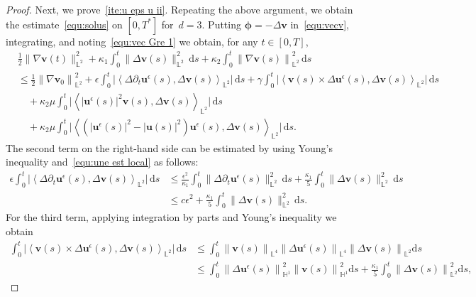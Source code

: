\documentclass[11pt,reqno]{amsart}
\theoremstyle{definition}
\numberwithin{equation}{section}
\newcommand{\bff}{\boldsymbol}
\newcommand{\bb}{\mathbb}
\newcommand{\ds}{\mathrm{d}s}
\newcommand{\nn}{\nonumber}
\newcommand{\norm}[2]{\left\|{#1}\right\|_{#2}}
\newcommand{\inpro}[2]{\left\langle#1,#2\right\rangle}
\begin{document}
\begin{proof}
	Next, we prove~\ref{ite:u eps u ii}. Repeating the above argument, we obtain the estimate~\eqref{equ:solus} on $[0,T^\ast]$ for~$d=3$.
	Putting $\bff{\phi}=-\Delta \bff{\bff{v}}$ in~\eqref{equ:vecv},
	integrating, and noting~\eqref{equ:vec Gre 1} we obtain, for any $t\in [0,T]$,
	\begin{align}\label{equ:vec Delta v}
		&\frac12 \|\nabla \bff{v}(t)\|_{\bb{L}^2}^2
		+\kappa_1\int_0^t \|\Delta\bff{v}(s)\|^2_{\bb{L}^2}\,\ds
		+
		\kappa_2\int_0^t \norm{\nabla \bff{v}(s)}{\bb{L}^2}^2\,\ds
		\nn\\
		&\le
		\frac12 \norm{\nabla \bff{v}_0}{\bb{L}^2}^2
		+
		\epsilon\int_0^t 
		\Big|
		\inpro{\Delta \partial_t \bff{u}^\epsilon(s)}{\Delta \bff{v}(s)}_{\bb{L}^2} \Big|\,\ds
		+
		\gamma\int_0^t 
		\Big|
		\inpro{\bff{v}(s)\times\Delta\bff{u}^\epsilon(s)}{\Delta\bff{v}(s)}_{\bb{L}^2}\Big|\,\ds
		\nn \\
		&\quad
		+\kappa_2\mu
		\int_{0}^{t} 
		\Big|
		\inpro{|\bff{u}^\epsilon(s)|^2\bff{v}(s)}{\Delta \bff{v}(s)}_{\bb{L}^2}\Big| \,\ds
		\nn \\
		&\quad
		+\kappa_2\mu
		\int_0^t 
		\Big|
		\inpro{(|\bff{u}^\epsilon(s)|^2-|\bff{u}(s)|^2)\bff{u}^\epsilon(s)}{\Delta \bff{v}(s)}_{\bb{L}^2}\Big| \,\ds.
	\end{align}
	The second term on the right-hand side can be estimated by using Young's
	inequality and~\eqref{equ:une est local} as follows:
	\begin{align*}%
		\epsilon \int_0^t 
		\Big|
		\inpro{\Delta\partial_t \bff{u}^\epsilon(s)}{\Delta \bff{v}(s)}_{\bb{L}^2} \Big| \,\ds
		&\leq 
		\frac{\epsilon^2}{\kappa_1}\int_0^t \|\Delta\partial_t \bff{u}^\epsilon(s)\|_{\bb{L}^2}^2\,\ds
		+
		\frac{\kappa_1}{5}\int_0^t \|\Delta\bff{v}(s)\|^2_{\bb{L}^2}\,\ds
		\nn\\
		&\leq 
		c \epsilon^2
		+
		\frac{\kappa_1}{5}\int_0^t \|\Delta\bff{v}(s)\|^2_{\bb{L}^2}\,\ds.
	\end{align*}
	For the third term, applying integration by parts and Young's inequality we obtain
	\begin{align*}%
		\int_0^t 
		\Big|
		\inpro{\bff{v}(s)\times\Delta\bff{u}^\epsilon(s)}{\Delta\bff{v}(s)}_{\bb{L}^2}\Big| \,\ds
		&\leq 
		\int_0^t \norm{\bff{v}(s)}{\bb{L}^4} \norm{\Delta \bff{u}^\epsilon(s)}{\bb{L}^4} \norm{\Delta \bff{v}(s)}{\bb{L}^2} \ds 
		\nn \\
		&\leq 
		\int_0^t \norm{\Delta \bff{u}^\epsilon(s)}{\bb{H}^1}^2 \norm{ \bff{v}(s)}{\bb{H}^1}^2 \ds
		+
		\frac{\kappa_1}{5} \int_0^t \norm{\Delta \bff{v}(s)}{\bb{L}^2}^2 \ds,

\end{align*}
\end{proof}
\end{document}

